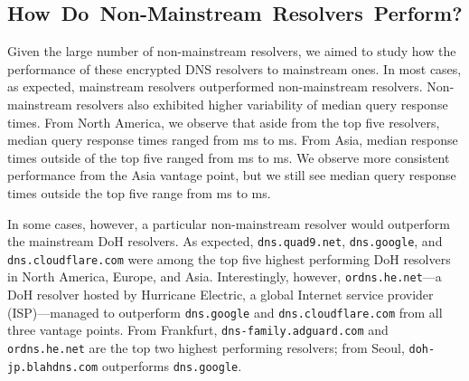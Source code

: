 \subsection{\mbox{How Do Non-Mainstream Resolvers Perform?}}

Given the large number of non-mainstream resolvers, we aimed to study how
the performance of these encrypted DNS resolvers to mainstream ones.
In most cases, as expected, mainstream resolvers outperformed non-mainstream resolvers.
Non-mainstream resolvers also exhibited higher variability of 
median query response times.  
From North America, we observe that aside from the top five resolvers,
median query response times ranged from 
ms to  ms.  From Asia, median response times outside
of the top five ranged from  ms to  ms.  We observe more
consistent performance from the Asia vantage point, but we still
see median query response times outside the top five range from  ms to
 ms.

In some cases, however, a particular non-mainstream resolver would outperform
the mainstream DoH resolvers.  As expected, \texttt{dns.quad9.net},
\texttt{dns.google}, and \texttt{dns.cloudflare.com} were among the top five
highest performing DoH resolvers in North America, Europe, and Asia.
Interestingly, however, \texttt{ordns.he.net}---a DoH resolver hosted by
Hurricane Electric, a global Internet service provider (ISP)---managed to
outperform \texttt{dns.google} and \texttt{dns.cloudflare.com} from all three
vantage points.  From Frankfurt, \texttt{dns-family.adguard.com} and
\texttt{ordns.he.net} are the top two highest performing resolvers; from
Seoul, \texttt{doh-jp.blahdns.com} outperforms \texttt{dns.google}.

